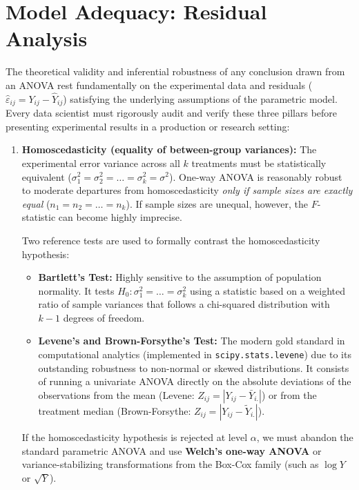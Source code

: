 \section{Model Adequacy: Residual Analysis}

The theoretical validity and inferential robustness of any conclusion drawn from an ANOVA rest fundamentally on the experimental data and residuals ($\hat{\varepsilon}_{ij} = Y_{ij} - \hat{Y}_{ij}$) satisfying the underlying assumptions of the parametric model. Every data scientist must rigorously audit and verify these three pillars before presenting experimental results in a production or research setting:

\begin{enumerate}
	\item \textbf{Homoscedasticity (equality of between-group variances):} The experimental error variance across all $k$ treatments must be statistically equivalent ($\sigma_1^2 = \sigma_2^2 = \ldots = \sigma_k^2 = \sigma^2$). One-way ANOVA is reasonably robust to moderate departures from homoscedasticity \emph{only if sample sizes are exactly equal} ($n_1 = n_2 = \ldots = n_k$). If sample sizes are unequal, however, the $F$-statistic can become highly imprecise.

	Two reference tests are used to formally contrast the homoscedasticity hypothesis:
	\begin{itemize}
		\item \textbf{Bartlett's Test:} Highly sensitive to the assumption of population normality. It tests $H_0: \sigma_1^2 = \ldots = \sigma_k^2$ using a statistic based on a weighted ratio of sample variances that follows a chi-squared distribution with $k-1$ degrees of freedom.
		\item \textbf{Levene's and Brown-Forsythe's Test:} The modern gold standard in computational analytics (implemented in \texttt{scipy.stats.levene}) due to its outstanding robustness to non-normal or skewed distributions. It consists of running a univariate ANOVA directly on the absolute deviations of the observations from the mean (Levene: $Z_{ij} = |Y_{ij} - \bar{Y}_{i.}|$) or from the treatment median (Brown-Forsythe: $Z_{ij} = |Y_{ij} - \tilde{Y}_{i.}|$).
	\end{itemize}
	If the homoscedasticity hypothesis is rejected at level $\alpha$, we must abandon the standard parametric ANOVA and use \textbf{Welch's one-way ANOVA} or variance-stabilizing transformations from the Box-Cox family (such as $\log Y$ or $\sqrt{Y}$).


\end{enumerate}
